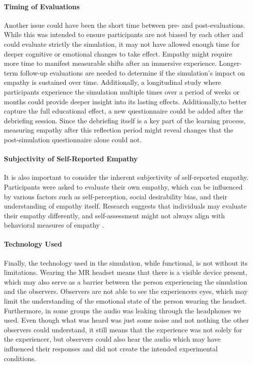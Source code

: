 \paragraph{Timing of Evaluations} Another issue could have been the short time between pre- and post-evaluations. While this was intended to ensure participants are not biased by each other and could evaluate strictly the simulation, it may not have allowed enough time for deeper cognitive or emotional changes to take effect. Empathy might require more time to manifest measurable shifts after an immersive experience. Longer-term follow-up evaluations are needed to determine if the simulation's impact on empathy is sustained over time. Additionally, a longitudinal study where participants experience the simulation multiple times over a period of weeks or months could provide deeper insight into its lasting effects. Additionally,to better capture the full educational effect, a new questionnaire could be added after the debriefing session. Since the debriefing itself is a key part of the learning process, measuring empathy after this reflection period might reveal changes that the post-simulation questionnaire alone could not.

\paragraph{Subjectivity of Self-Reported Empathy} It is also important to consider the inherent subjectivity of self-reported empathy. Participants were asked to evaluate their own empathy, which can be influenced by various factors such as self-perception, social desirability bias, and their understanding of empathy itself. Research suggests that individuals may evaluate their empathy differently, and self-assessment might not always align with behavioral measures of empathy \cite{Sunahara2022}.

\paragraph{Technology Used} Finally, the technology used in the simulation, while functional, is not without its limitations. Wearing the MR headset means that there is a visible device present, which may also serve as a barrier between the person experiencing the simulation and the observers. Observers are not able to see the experiencers eyes, which may limit the understanding of the emotional state of the person wearing the headset. Furthermore, in some groups the audio was leaking through the headphones we used. Even though what was heard was just some noise and not nothing the other observers could understand, it still means that the experience was not solely for the experiencer, but observers could also hear the audio which may have influenced their responses and did not create the intended experimental conditions.

